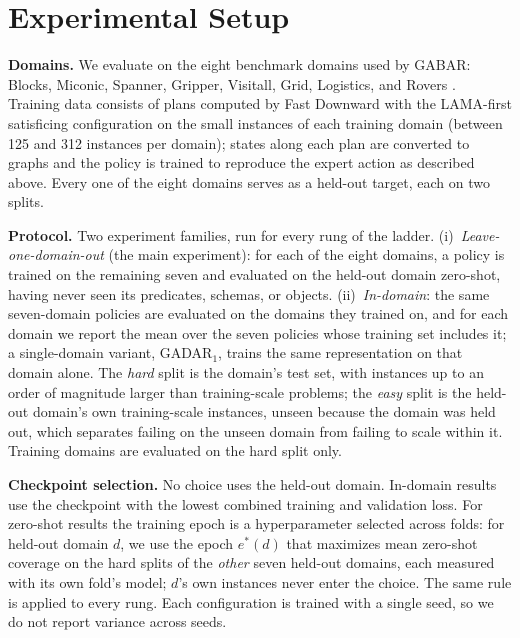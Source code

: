 \documentclass[letterpaper]{article} %
\newcommand{\gadar}{GADAR}                 %
\begin{document}
\section{Experimental Setup}

\textbf{Domains.} We evaluate on the eight benchmark domains used by GABAR:
Blocks, Miconic, Spanner, Gripper, Visitall, Grid, Logistics, and
Rovers \citep{gabar, pddl-generators}. Training data consists of plans
computed by Fast Downward with the LAMA-first satisficing configuration
\citep{fast_downward} on the small instances of each training domain
(between 125 and 312 instances per domain); states along each plan are
converted to graphs and the policy is trained to reproduce the expert
action as described above. Every one of the eight domains serves as a
held-out target, each on two splits.

\textbf{Protocol.} Two experiment families, run for every rung of the
ladder. (i)~\emph{Leave-one-domain-out} (the main experiment): for each of
the eight domains, a policy is trained on the remaining seven and evaluated
on the held-out domain zero-shot, having never seen its predicates,
schemas, or objects. (ii)~\emph{In-domain}: the same seven-domain policies
are evaluated on the domains they trained on, and for each domain we report
the mean over the seven policies whose training set includes it; a
single-domain variant, \gadar{}$_1$, trains the same representation on that
domain alone. The \emph{hard} split is the domain's test
set, with instances up to an order of magnitude larger than training-scale
problems; the \emph{easy} split is the held-out domain's own
training-scale instances, unseen because the domain was held out, which
separates failing on the unseen domain from failing to scale within it.
Training domains are evaluated on the hard split only.

\textbf{Checkpoint selection.} No choice uses the held-out domain.
In-domain results use the checkpoint with the lowest combined training and
validation loss. For zero-shot results the training epoch is a
hyperparameter selected across folds: for held-out domain $d$, we use the
epoch $e^*(d)$ that maximizes mean zero-shot coverage on the hard splits of
the \emph{other} seven held-out domains, each measured with its own fold's
model; $d$'s own instances never enter the choice. The same rule is applied
to every rung. Each configuration is trained with a single seed, so we do
not report variance across seeds.
\end{document}
